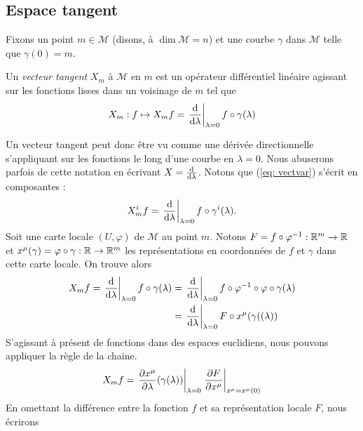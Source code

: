 \subsection{Espace tangent}
Fixons un point $m\in \mathcal{M}$ (disons, à $\dim \mathcal{M} = n$) et une courbe $\gamma$ dans $\mathcal{M}$ telle que $\gamma(0)=m$.
\begin{theoremframe}
    \begin{defi}
        Un \emph{vecteur tangent} $X_m$ à $\mathcal{M}$ en $m$ est un opérateur différentiel linéaire agissant sur les fonctions lisses dans un voisinage de $m$ tel que
        \begin{equation}
        \label{eq: vectvar}
            X_m : f \mapsto X_m f =\left. \frac{\mathrm{d}}{\mathrm{d} \lambda}\right|_{\lambda=0}  f \circ \gamma(\lambda)
        \end{equation}
    \end{defi}
\end{theoremframe}
Un vecteur tangent peut donc être vu comme une dérivée directionnelle s'appliquant sur les fonctions le long d'une courbe en $\lambda=0$. Nous abuserons parfois de cette notation en écrivant $X = \frac{\mathrm{d}}{\mathrm{d} \lambda}$. Notons que (\ref{eq: vectvar}) s'écrit en composantes :
\begin{equation}
    X^i_m f = \left. \frac{\mathrm{d}}{\mathrm{d} \lambda}\right|_{\lambda=0}  f \circ \gamma^i(\lambda).
\end{equation}
Soit une carte locale $(U,\varphi)$ de $\mathcal{M}$ au point $m$. Notons $F = f \circ \varphi^{-1} : \mathbb{R}^m\to \mathbb{R}$ et $x^\mu(\gamma) = \varphi \circ \gamma: \mathbb{R} \to \mathbb{R}^m$ les représentations en coordonnées de $f$ et $\gamma$ dans cette carte locale. On trouve alors
\begin{align*}
    X_m f = \left. \frac{\mathrm{d}}{\mathrm{d} \lambda}\right|_{\lambda=0}  f \circ \gamma(\lambda) &= \left. \frac{\mathrm{d}}{\mathrm{d} \lambda}\right|_{\lambda=0}  f \circ \varphi^{-1} \circ \varphi \circ \gamma(\lambda)\\
    & = \left. \frac{\mathrm{d}}{\mathrm{d} \lambda}\right|_{\lambda=0}  F \circ x^\mu(\gamma((\lambda))
\end{align*}
S'agissant à présent de fonctions dans des espaces euclidiens, nous pouvons appliquer la règle de la chaine.
\begin{align}
    X_mf = \left. \frac{\partial x^\mu}{\partial \lambda} (\gamma(\lambda))\right|_{\lambda = 0} \left. \frac{\partial F}{\partial x^\mu} \right|_{x^\mu=x^\mu(0)}
\end{align}
En omettant la différence entre la fonction $f$ et sa représentation locale $F$, nous écrirons
